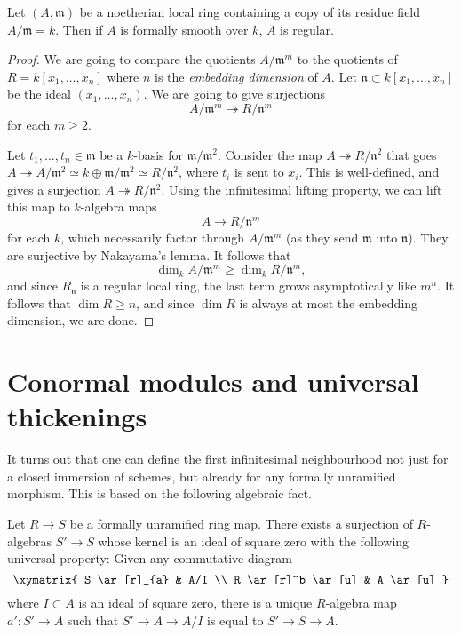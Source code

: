 \begin{theorem} 
Let $(A, \mathfrak{m})$ be a noetherian local ring containing a copy of its
residue field $A/\mathfrak{m}= k$. Then if $A$ is formally smooth over $k$, $A$
is regular.
\end{theorem} 
\begin{proof} 
We are going to compare the quotients $A/\mathfrak{m}^m$ to the quotients of
$R= k[x_1, \dots, x_n]$ where  $n$ is the \emph{embedding dimension} of
$A$.
Let $\mathfrak{n} \subset k[x_1, \dots, x_n]$ be the ideal $(x_1, \dots, x_n)$. 
We are going to give surjections
\[ A/\mathfrak{m}^m \twoheadrightarrow R/\mathfrak{n}^m  \]
for each $m \geq 2$.

Let $t_1, \dots, t_n \in \mathfrak{m}$ be a $k$-basis for
$\mathfrak{m}/\mathfrak{m}^2$.
Consider the map $A \twoheadrightarrow R/\mathfrak{n}^2 $ that goes
$A  \twoheadrightarrow A/\mathfrak{m}^2 \simeq  k \oplus
\mathfrak{m}/\mathfrak{m}^2 \simeq R/\mathfrak{n}^2$, where $t_i$ is sent to
$x_i$. This is well-defined, and gives a surjection $A \twoheadrightarrow
R/\mathfrak{n}^2$.
Using the infinitesimal lifting property, we can lift this map to
$k$-algebra maps
\[ A \to R/\mathfrak{n}^m  \]
for each $k$, which necessarily factor through $A/\mathfrak{m}^m$ (as they send
$\mathfrak{m}$ into $\mathfrak{n}$). They are surjective by Nakayama's lemma.
It follows that
\[ \dim_k A/\mathfrak{m}^m \geq \dim_k R/\mathfrak{n}^m,  \]
and since $R_{\mathfrak{n}}$ is a regular local ring, the last term grows
asymptotically like $m^n$. It follows that $\dim R \geq n$, and since $\dim R$
is always at most the embedding dimension, we are done.
\end{proof} 

\section{Conormal modules and universal thickenings}
\label{section-conormal}

\noindent
It turns out that one can define the first infinitesimal neighbourhood
not just for a closed immersion of schemes, but already for any formally
unramified morphism. This is based on the following algebraic fact.

\begin{lemma}
\label{lemma-universal-thickening}
Let $R \to S$ be a formally unramified ring map. There exists a surjection of
$R$-algebras $S' \to S$ whose kernel is an ideal of square zero with the
following universal property: Given any commutative diagram
$$
\xymatrix{
S \ar[r]_{a} & A/I \\
R \ar[r]^b \ar[u] & A \ar[u]
}
$$
where $I \subset A$ is an ideal of square zero, there is a unique $R$-algebra
map $a' : S' \to A$ such that $S' \to A \to A/I$ is equal to $S' \to S \to A$.
\end{lemma}

